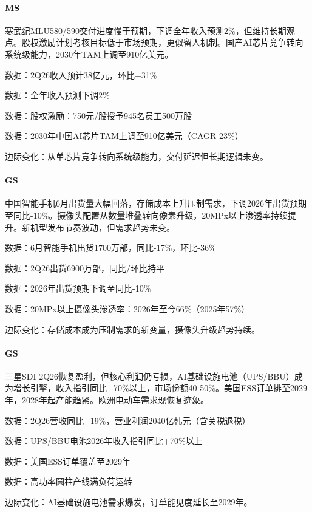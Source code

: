 \documentclass[11pt]{ctexart}
\begin{document}
\paragraph{MS} 寒武纪MLU580/590交付进度慢于预期，下调全年收入预测2\%，但维持长期观点。股权激励计划考核目标低于市场预期，更似留人机制。国产AI芯片竞争转向系统级能力，2030年TAM上调至910亿美元。
{\small\color{refgray}数据：2Q26收入预计38亿元，环比+31\%\par}
{\small\color{refgray}数据：全年收入预测下调2\%\par}
{\small\color{refgray}数据：股权激励：750元/股授予945名员工500万股\par}
{\small\color{refgray}数据：2030年中国AI芯片TAM上调至910亿美元（CAGR 23\%）\par}
{\small\color{refgray}边际变化：从单芯片竞争转向系统级能力，交付延迟但长期逻辑未变。\par}
\paragraph{GS} 中国智能手机6月出货量大幅回落，存储成本上升压制需求，下调2026年出货预期至同比-10\%。摄像头配置从数量堆叠转向像素升级，20MPx以上渗透率持续提升。新机型发布节奏波动，但需求趋势未变。
{\small\color{refgray}数据：6月智能手机出货1700万部，同比-17\%，环比-36\%\par}
{\small\color{refgray}数据：2Q26出货6900万部，同比/环比持平\par}
{\small\color{refgray}数据：2026年出货预期下调至同比-10\%\par}
{\small\color{refgray}数据：20MPx以上摄像头渗透率：2026年至今66\%（2025年57\%）\par}
{\small\color{refgray}边际变化：存储成本成为压制需求的新变量，摄像头升级趋势持续。\par}
\paragraph{GS} 三星SDI 2Q26恢复盈利，但核心利润仍亏损，AI基础设施电池（UPS/BBU）成为增长引擎，收入指引同比+70\%以上，市场份额40-50\%。美国ESS订单排至2029年，2028年起产能趋紧。欧洲电动车需求现恢复迹象。
{\small\color{refgray}数据：2Q26营收同比+19\%，营业利润2040亿韩元（含关税退税）\par}
{\small\color{refgray}数据：UPS/BBU电池2026年收入指引同比+70\%以上\par}
{\small\color{refgray}数据：美国ESS订单覆盖至2029年\par}
{\small\color{refgray}数据：高功率圆柱产线满负荷运转\par}
{\small\color{refgray}边际变化：AI基础设施电池需求爆发，订单能见度延长至2029年。\par}
\end{document}

